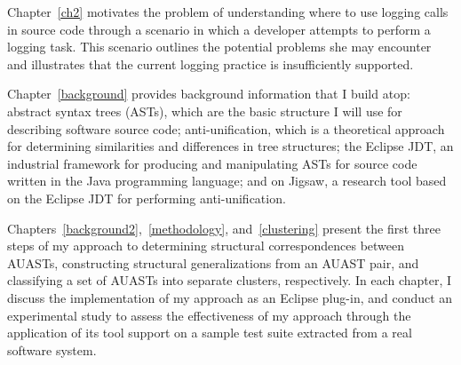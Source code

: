 Chapter~\ref{ch2} motivates the problem of understanding where to use logging calls in source code through a scenario in which a developer attempts to perform a logging task. This scenario outlines the potential problems she may encounter and illustrates that the current logging practice is insufficiently supported.

Chapter~\ref{background} provides background information that I build atop: abstract syntax trees (ASTs), which are the basic structure I will use for describing software source code; anti-unification, which is a theoretical approach for determining similarities and differences in tree structures; the Eclipse JDT, an industrial framework for producing and manipulating ASTs for source code written in the Java programming language; and on Jigsaw, a research tool based on the Eclipse JDT for performing anti-unification.



Chapters~\ref{background2},~\ref{methodology}, and~\ref{clustering} present the first three steps of my approach to determining structural correspondences between AUASTs, constructing structural generalizations from an AUAST pair, and classifying a set of AUASTs into separate clusters, respectively. In each chapter, I discuss the implementation of my approach as an Eclipse plug-in, and conduct an experimental study to assess the effectiveness of my approach through the application of its tool support on a sample test suite extracted from a real software system.





